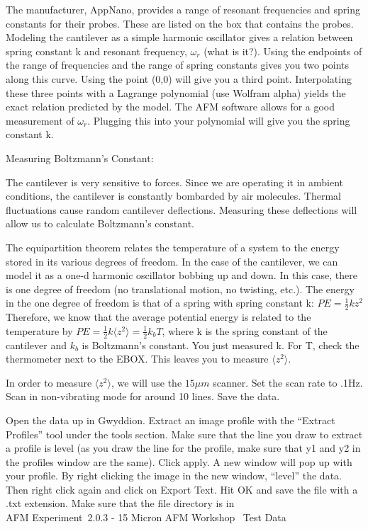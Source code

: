 \documentclass{../lab}
\begin{document}
The manufacturer, AppNano, provides a range of resonant frequencies and spring constants for their probes. These are listed on the box that contains the probes. Modeling the cantilever as a simple harmonic oscillator gives a relation between spring constant k and resonant frequency, $\omega_{r}$ (what is it?). Using the endpoints of the range of frequencies and the range of spring constants gives you two points along this curve. Using the point (0,0) will give you a third point. Interpolating these three points with a Lagrange polynomial (use Wolfram alpha) yields the exact relation predicted by the model. The AFM software allows for a good measurement of $\omega_{r}$. Plugging this into your polynomial will give you the spring constant k.

Measuring Boltzmann's Constant:

The cantilever is very sensitive to forces. Since we are operating it in ambient conditions, the cantilever is constantly bombarded by air molecules. Thermal fluctuations cause random cantilever deflections. Measuring these deflections will allow us to calculate Boltzmann’s constant.

The equipartition theorem relates the temperature of a system to the energy stored in its various degrees of freedom. In the case of the cantilever, we can model it as a one-d harmonic oscillator bobbing up and down. In this case, there is one degree of freedom (no translational motion, no twisting, etc.). The energy in the one degree of freedom is that of a spring with spring constant k: $PE = \frac{1}{2} kz^{2}$ Therefore, we know that the average potential energy is related to the temperature by $PE = \frac{1}{2} k \langle z^{2} \rangle = \frac{1}{2} k_{b} T$, where k is the spring constant of the cantilever and $k_{b}$ is Boltzmann’s constant. You just measured k. For T, check the thermometer next to the EBOX. This leaves you to measure $\langle z^{2} \rangle$.

In order to measure $\langle z^{2} \rangle$, we will use the $15\mu m$ scanner. Set the scan rate to .1Hz. Scan in non-vibrating mode for around 10 lines. Save the data.

Open the data up in Gwyddion. Extract an image profile with the ``Extract Profiles'' tool under the tools section. Make sure that the line you draw to extract a profile is level (as you draw the line for the profile, make sure that y1 and y2 in the profiles window are the same). Click apply. A new window will pop up with your profile.  By right clicking the image in the new window, ``level'' the data. Then right click again and click on Export Text. Hit OK and save the file with a .txt extension. Make sure that the file directory is in \\AFM Experiment\ 2.0.3 - 15 Micron AFM Workshop \ Test Data
\end{document}
